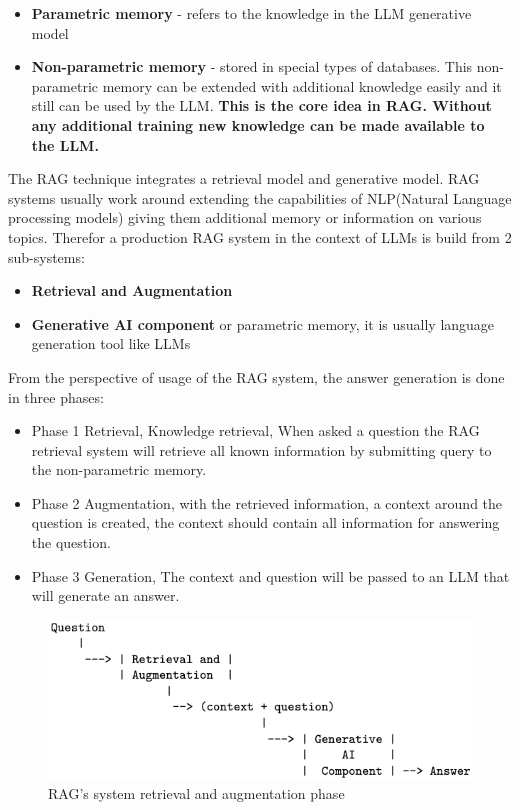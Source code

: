 \documentclass{wseas}
\begin{document}
\begin{itemize}

\item
  \textbf{Parametric memory} - refers to the knowledge in the LLM
  generative model
\item
  \textbf{Non-parametric memory} - stored in special types of databases.
  This non-parametric memory can be extended with additional knowledge
  easily and it still can be used by the LLM. \textbf{This is the core
  idea in RAG. Without any additional training new knowledge can be made
  available to the LLM.}
\end{itemize}

The RAG technique integrates a retrieval model and generative model. RAG
systems usually work around extending the capabilities of NLP(Natural
Language processing models) giving them additional memory or information
on various topics. Therefor a production RAG system in the context of
LLMs is build from 2 sub-systems:

\begin{itemize}

\item
  \textbf{Retrieval and Augmentation}
\item
  \textbf{Generative AI component} or parametric memory, it is usually
  language generation tool like LLMs
\end{itemize}

From the perspective of usage of the RAG system, the answer generation is
done in three phases:

\begin{itemize}

\item
  Phase 1 Retrieval, Knowledge retrieval, When asked a question the RAG
  retrieval system will retrieve all known information by submitting query 
  to the non-parametric memory.
\item
  Phase 2 Augmentation, with the retrieved information, a context around
  the question is created, the context should contain all information
  for answering the question.
\item
  Phase 3 Generation, The context and question will be passed to an LLM
  that will generate an answer.
\end{itemize}


\begin{figure}[htbp]
  \centering
  \includegraphics[width=\linewidth]{resources/v1/retrievalAndAugmentation.png}
  \caption{RAG's system retrieval and augmentation phase}
  \label{fig:rag_system_figure}
\end{figure}
\end{document}
